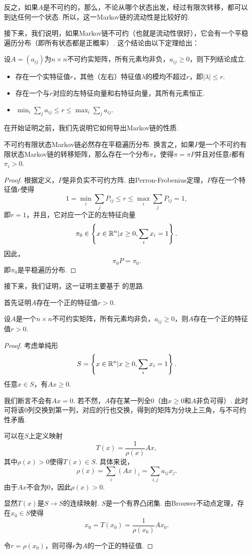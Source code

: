 反之，如果$A$是不可约的，那么，不论从哪个状态出发，经过有限次转移，都可以到达任何一个状态. 所以，这一Markov链的流动性是比较好的.

接下来，我们说明，如果Markov链不可约（也就是流动性很好），它会有一个平稳遍历分布（即所有状态都是正概率）. 这个结论由以下定理给出：

\begin{theorem}\label{theorem:perron-frobenius}
    设$A=(a_{ij})$为$n\times n$不可约实矩阵，所有元素均非负，$a_{ij}\geq 0$，则下列结论成立.
    \begin{itemize}
        \item 存在一个实特征值$r$，其他（左右）特征值$\lambda$的模均不超过$r$，即$|\lambda|\leq r$.
        \item 存在一个与$r$对应的左特征向量和右特征向量，其所有元素恒正.
        \item $\min_i\sum_{j}a_{ij}\leq r\leq \max_i\sum_j a_{ij}$.
    \end{itemize}
\end{theorem}

在开始证明之前，我们先说明它如何导出Markov链的性质. 

\begin{corollary}
    不可约有限状态Markov链必然存在平稳遍历分布. 换言之，如果$P$是一个不可约有限状态Markov链的转移矩阵，那么存在一个分布$\pi$，使得$\pi=\pi P$并且对任意$i$都有$\pi_{i}>0$.
\end{corollary}
\begin{proof}
    根据定义，$P$是非负实不可约方阵. 由Perron-Frobenius定理，$P$存在一个特征值$r$使得
    \[1=\min_i\sum_jP_{ij}\leq r\le\max_i\sum_j P_{ij}=1,\]
    即$r=1$，并且，它对应一个正的左特征向量
    \[\pi_0\in \left\{x\in\mathbb{R}^n|x\geq 0,\sum_ix_i=1\right\}.\]
    因此，
    \[\pi_0 P = \pi_0.\]
    即$\pi_0$是平稳遍历分布. 
\end{proof}

接下来，我们证明，这一证明主要基于 \cite{debreuNonnegativeSquareMatrices1953} 的思路. 

首先证明$A$存在一个正的特征值$r>0$.

\begin{lemma}\label{lemma:positive-eigenvalue}
    设$A$是一个$n\times n$不可约实矩阵，所有元素均非负，$a_{ij}\geq 0$，则$A$存在一个正的特征值$r>0$.
\end{lemma}
\begin{proof}
考虑单纯形
\[S=\left\{x\in\mathbb{R}^n|x\geq 0,\sum_i x_i=1\right\}.\]
任意$x\in S$，有$Ax\geq 0$. 

我们断言不会有$Ax=0$. 若不然，$A$存在某一列全$0$（由$x\geq 0$和$A$非负可得）. 此时可将该$0$列交换到第一列，对应的行也交换，得到的矩阵为分块上三角，与不可约性矛盾.

可以在$S$上定义映射
\[T(x) = \frac1{\rho(x)}Ax,\]
其中$\rho(x) > 0$使得$T(x)\in S$. 具体来说，
\[\rho(x) = \sum_i (Ax)_i = \sum_{i,j} a_{ij}x_j.\]
由于$Ax$不会为$0$，因此$\rho(x)>0$.

显然$T(x)$是$S\to S$的连续映射. $S$是一个有界凸闭集. 由Brouwer不动点定理，存在$x_0\in S$使得
\[x_0 = T(x_0)=\frac1{\rho(x_0)}Ax_0.\]

令$r=\rho(x_0)$，则可得$r$为$A$的一个正的特征值.
\end{proof}

